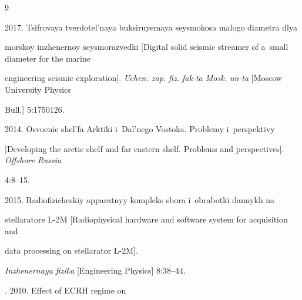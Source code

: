 {\small\frenchspacing

{%


\begin{thebibliography}{9}




 2017. Tsifrovaya tverdotel'naya buksiruyemaya seysmokosa malogo diametra dlya 

morskoy inzhenernoy seysmorazvedki [Digital solid seismic streamer of a~small diameter for the marine 

engineering seismic exploration]. \textit{Uchen. zap. fiz. fak-ta Mosk. un-ta} [Moscow University Physics 

Bull.] 5:1750126.


 2014. Osvoenie shel'fa Arktiki i~Dal'nego Vostoka. Problemy i~perspektivy 

[Developing the arctic shelf and far eastern shelf. Problems and perspectives]. \textit{\\Offshore Russia} 

4:8--15.


 2015. Radiofizicheskiy apparatnyy kompleks sbora i~obrabotki dannykh na 

stellaratore L-2M [Radiophysical hardware and software system for acquisition and

data processing on  stellarator L-2M]. 

\textit{Inzhenernaya fizika} [Engineering Physics] 8:38--44.




. 2010. Effect of ECRH regime on 


\end{thebibliography}}}
